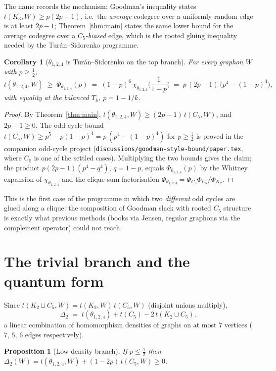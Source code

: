 \documentclass[11pt]{article}
\newtheorem{proposition}[theorem]{Proposition}
\newtheorem{corollary}[theorem]{Corollary}
\theoremstyle{definition}
\newcommand{\thet}{\theta_{1,2,4}}
\begin{document}
The name records the mechanism: Goodman's inequality states
$t(K_3,W)\ge p(2p-1)$, i.e.\ the \emph{average} codegree over a uniformly
random edge is at least $2p-1$; Theorem~\ref{thm:main} states the same lower
bound for the average codegree over a \emph{$C_5$-biased} edge, which is the
rooted gluing inequality needed by the Tur\'an--Sidorenko programme.

\begin{corollary}[$\thet$ is Tur\'an--Sidorenko on the top branch]\label{cor:ts}
For every graphon $W$ with $p\ge\tfrac12$,
\[
  t(\thet,W)\;\ge\;\Phi_{\thet}(p)\;=\;(1-p)^{6}\,\chi_{\thet}\!\Big(\frac1{1-p}\Big)
  \;=\;p\,(2p-1)\,\big(p^{4}-(1-p)^{4}\big),
\]
with equality at the balanced $T_k$, $p=1-1/k$.
\end{corollary}

\begin{proof}
By Theorem~\ref{thm:main}, $t(\thet,W)\ge(2p-1)\,t(C_5,W)$, and $2p-1\ge0$.
The odd-cycle bound $t(C_5,W)\ge p^5-p(1-p)^4=p\,(p^4-(1-p)^4)$ for
$p\ge\tfrac12$ is proved in the companion odd-cycle project
(\texttt{discussions/goodman-style-bound/paper.tex}, where $C_5$ is one of the
settled cases).  Multiplying the two bounds gives the claim; the product
$p(2p-1)(p^4-q^4)$, $q=1-p$, equals $\Phi_{\thet}(p)$ by the Whitney expansion
of $\chi_{\thet}$ and the clique-sum factorisation
$\Phi_{\thet}=\Phi_{C_3}\Phi_{C_5}/\Phi_{K_2}$.
\end{proof}

This is the first case of the programme in which two \emph{different} odd
cycles are glued along a clique: the composition of Goodman slack with rooted
$C_5$ structure is exactly what previous methods (books via Jensen, regular
graphons via the complement operator) could not reach.

\section{The trivial branch and the quantum form}

Since $t(K_2\sqcup C_5,W)=t(K_2,W)\,t(C_5,W)$ (disjoint unions multiply),
\begin{equation}\label{eq:quantum}
  \Delta_2 \;=\; t(\thet)+t(C_5)-2\,t(K_2\sqcup C_5),
\end{equation}
a linear combination of homomorphism densities of graphs on at most $7$
vertices ($7$, $5$, $6$ edges respectively).

\begin{proposition}[Low-density branch]\label{prop:lowp}
If $p\le\tfrac12$ then $\Delta_2(W)=t(\thet,W)+(1-2p)\,t(C_5,W)\ge0$.
\end{proposition}
\end{document}
